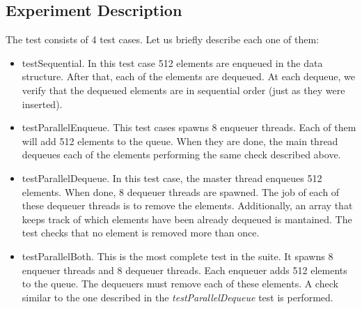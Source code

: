 \subsection{Experiment Description}
\par
The test consists of 4 test cases. Let us briefly describe each one of them:
\par
\begin{itemize}
\item testSequential. In this test case 512 elements are enqueued in the data
structure. After that, each of the elements are dequeued. At each dequeue, we
verify that the dequeued elements are in sequential order (just as they were
inserted).
\item testParallelEnqueue. This test cases spawns $8$ enqueuer threads. Each of
them will add 512 elements to the queue. When they are done, the main thread
dequeues each of the elements performing the same check described above.
\item testParallelDequeue. In this test case, the master thread enqueues 512
elements. When done, 8 dequeuer threads are spawned. The job of each of these
dequeuer threads is to remove the elements. Additionally, an array that keeps
track of which elements have been already dequeued is mantained. The test
checks that no element is removed more than once.
\item testParallelBoth. This is the most complete test in the suite. It spawns
8 enqueuer threads and 8 dequeuer threads. Each enqueuer adds 512 elements to
the queue. The dequeuers must remove each of these elements. A check similar to
the one described in the \textit{testParallelDequeue} test is performed.
\end{itemize}
\par
